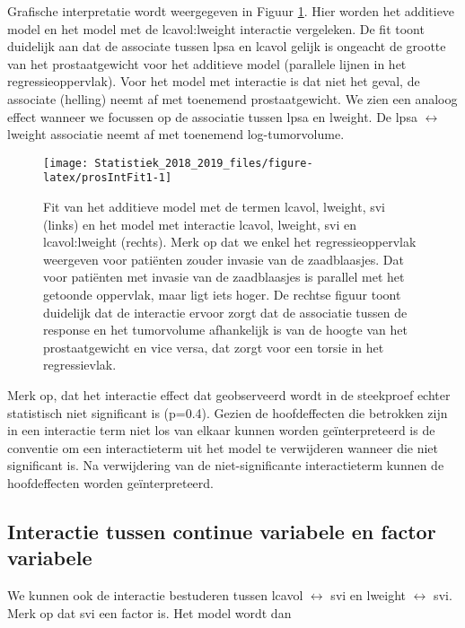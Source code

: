 \documentclass[12pt,dutch,coursenotes]{book}
\theoremstyle{definition}
\theoremstyle{definition}
\theoremstyle{definition}
\theoremstyle{remark}
\begin{document}
Grafische interpretatie wordt weergegeven in Figuur
\ref{fig:prosIntFit1}. Hier worden het additieve model en het model met
de lcavol:lweight interactie vergeleken. De fit toont duidelijk aan dat
de associate tussen lpsa en lcavol gelijk is ongeacht de grootte van het
prostaatgewicht voor het additieve model (parallele lijnen in het
regressieoppervlak). Voor het model met interactie is dat niet het
geval, de associate (helling) neemt af met toenemend prostaatgewicht. We
zien een analoog effect wanneer we focussen op de associatie tussen lpsa
en lweight. De lpsa \(\leftrightarrow\) lweight associatie neemt af met
toenemend log-tumorvolume.

\begin{figure}

{\centering \texttt{[image: Statistiek\_2018\_2019\_files/figure-latex/prosIntFit1-1]} 

}

\caption{Fit van het additieve model met de termen lcavol, lweight, svi (links) en het model met interactie lcavol, lweight, svi en lcavol:lweight (rechts). Merk op dat we enkel het regressieoppervlak weergeven voor patiënten zouder invasie van de zaadblaasjes. Dat voor patiënten met invasie van de zaadblaasjes is parallel met het getoonde oppervlak, maar ligt iets hoger. De rechtse figuur toont duidelijk dat de interactie ervoor zorgt dat de associatie tussen de response en het tumorvolume afhankelijk is van de hoogte van het prostaatgewicht en vice versa, dat zorgt voor een torsie in het regressievlak.}\label{fig:prosIntFit1}
\end{figure}

Merk op, dat het interactie effect dat geobserveerd wordt in de
steekproef echter statistisch niet significant is (p=0.4). Gezien de
hoofdeffecten die betrokken zijn in een interactie term niet los van
elkaar kunnen worden geïnterpreteerd is de conventie om een
interactieterm uit het model te verwijderen wanneer die niet significant
is. Na verwijdering van de niet-significante interactieterm kunnen de
hoofdeffecten worden geïnterpreteerd.

\subsection{Interactie tussen continue variabele en factor
variabele}\label{interactie-tussen-continue-variabele-en-factor-variabele}

We kunnen ook de interactie bestuderen tussen lcavol \(\leftrightarrow\)
svi en lweight \(\leftrightarrow\) svi. Merk op dat svi een factor is.
Het model wordt dan
\end{document}
